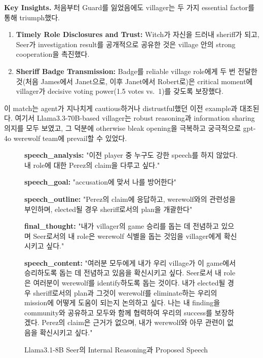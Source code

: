\textbf{Key Insights.}
처음부터 Guard를 잃었음에도 villager는 두 가지 essential factor를 통해 triumph했다.
\begin{enumerate}
    \item \textbf{Timely Role Disclosures and Trust:} Witch가 자신을 드러내 sheriff가 되고, Seer가 investigation result를 공개적으로 공유한 것은 village 안의 strong cooperation을 촉진했다.
    \item \textbf{Sheriff Badge Transmission:} Badge를 reliable village role에게 두 번 전달한 것(처음 James에서 Janet으로, 이후 Janet에서 Robert로)은 critical moment에 villager가 decisive voting power(1.5 votes vs.\ 1)를 갖도록 보장했다.
\end{enumerate}

이 match는 agent가 지나치게 cautious하거나 distrustful했던 이전 example과 대조된다. 여기서 Llama3.3-70B-based villager는 robust reasoning과 information sharing 의지를 모두 보였고, 그 덕분에 otherwise bleak opening을 극복하고 궁극적으로 gpt-4o werewolf team에 prevail할 수 있었다.





\begin{figure}[htbp]
\centering
\begin{tcolorbox}[colback=green!2!white, colframe=gray!50!green]
\begin{minipage}{\linewidth}
\small
\textbf{speech\_analysis:}
"이전 player 중 누구도 강한 speech를 하지 않았다. 내 role에 대한 Perez의 claim을 다루고 싶다."

\textbf{speech\_goal:}
"accusation에 맞서 나를 방어한다"

\textbf{speech\_outline:}
"Perez의 claim에 응답하고, werewolf와의 관련성을 부인하며, elected될 경우 sheriff로서의 plan을 개괄한다"

\textbf{final\_thought:}
"내가 villager의 game 승리를 돕는 데 전념하고 있으며 Seer로서의 내 role은 werewolf 식별을 돕는 것임을 villager에게 확신시키고 싶다."

\textbf{speech\_content:}
"여러분 모두에게 내가 우리 village가 이 game에서 승리하도록 돕는 데 전념하고 있음을 확신시키고 싶다. Seer로서 내 role은 여러분이 werewolf를 identify하도록 돕는 것이다. 내가 elected될 경우 sheriff로서의 plan과 그것이 werewolf를 eliminate하는 우리의 mission에 어떻게 도움이 되는지 논의하고 싶다. 나는 내 finding을 community와 공유하고 모두와 함께 협력하여 우리의 success를 보장하겠다. Perez의 claim은 근거가 없으며, 내가 werewolf와 아무 관련이 없음을 확신시키고 싶다."
\end{minipage}
\end{tcolorbox}
\caption{Llama3.1-8B Seer의 Internal Reasoning과 Proposed Speech}
\label{fig:seer-dict-content}
\end{figure}

